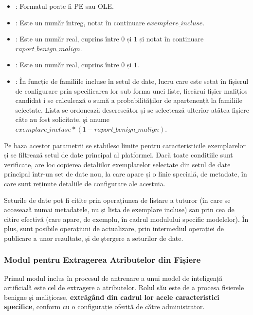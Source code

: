 \documentclass[../../main.tex]{subfiles}
\begin{document}
\begin{itemize}
    \item {}: Formatul poate fi PE sau OLE.
    \item {}: Este un număr întreg, notat în continuare $ exemplare\_incluse $.
    \item {}: Este un număr real, cuprins între $ 0 $ și $ 1 $ și notat în continuare $ raport\_benign\_malign $.
    \item {}: Este un număr real, cuprins între $ 0 $ și $ 1 $.
    \item {}: În funcție de familiile incluse în setul de date, lucru care este setat în fișierul de configurare prin specificarea lor sub forma unei liste, fiecărui fișier malițios candidat i se calculează o sumă a probabilităților de apartenență la familiile selectate. Lista se ordonează descrescător și se selectează ulterior atâtea fișiere câte au fost solicitate, și anume $ exemplare\_incluse * (1 - raport\_benign\_malign) $.
\end{itemize}

Pe baza acestor parametrii se stabilesc limite pentru caracteristicile exemplarelor și se filtrează setul de date principal al platformei. Dacă toate condițiile sunt verificate, are loc copierea detaliilor exemplarelor selectate din setul de date principal într-un set de date nou, la care apare și o linie specială, de metadate, în care sunt reținute detaliile de configurare ale acestuia.

Seturile de date pot fi citite prin operațiunea de listare a tuturor (în care se accesează numai metadatele, nu și lista de exemplare incluse) sau prin cea de citire efectivă (care apare, de exemplu, în cadrul modulului specific modelelor). În plus, sunt posibile operațiuni de actualizare, prin intermediul operației de publicare a unor rezultate, și de ștergere a seturilor de date.

\subsubsection{Modul pentru Extragerea Atributelor din Fișiere}

Primul modul inclus în procesul de antrenare a unui model de inteligență artificială este cel de extragere a atributelor. Rolul său este de a procesa fișierele benigne și malițioase, \textbf{extrăgând din cadrul lor acele caracteristici specifice}, conform cu o configurație oferită de către administrator.
\end{document}
